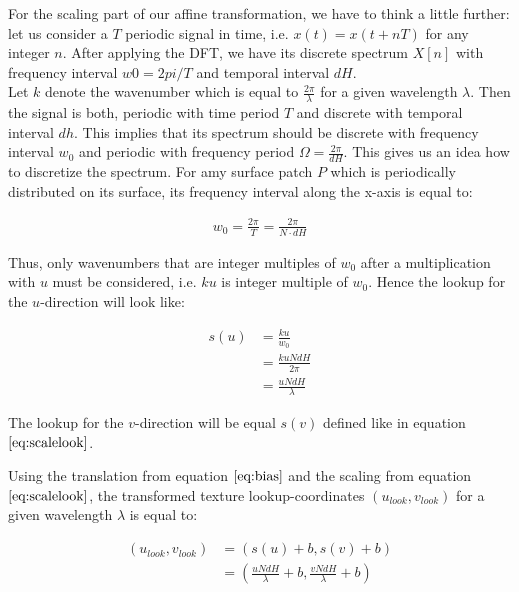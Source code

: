 For the scaling part of our affine transformation, we have to think a little further: let us consider a $T$ periodic signal in time, i.e. $x(t) = x(t+nT)$ for any integer $n$. After applying the DFT, we have its discrete spectrum $X[n]$ with frequency interval $w0 = 2pi / T$ and temporal interval $dH$. \\

Let $k$ denote the wavenumber which is equal to $\frac{2 \pi}{\lambda}$ for a given wavelength $\lambda$. Then the signal is both, periodic with time period $T$ and discrete with temporal interval $dh$. This implies that its spectrum should be discrete with frequency interval $w_0$ and periodic with frequency period $\Omega = \frac{2 \pi}{dH}$. This gives us an idea how to discretize the spectrum. For amy surface patch $P$ which is periodically distributed on its surface, its frequency interval along the x-axis is equal to: 

\begin{align}
  w_0 = \frac{2 \pi}{T} = \frac{2 \pi}{N \cdot dH}
\end{align}

Thus, only wavenumbers that are integer multiples of $w_0$ after a multiplication with $u$ must be considered, i.e. $ku$ is integer multiple of $w_0$. Hence the lookup for the $u$-direction will look like:

\begin{align}
    s(u)
    &=\frac{ku}{w_0} \nonumber \\
    &= \frac{ku N dH}{2 \pi} \nonumber \\
    &= \frac{u N dH}{\lambda}
\label{eq:scalelook}
\end{align}

The lookup for the $v$-direction will be equal $s(v)$ defined like in equation $\ref{eq:scalelook}$.

Using the translation from equation $\ref{eq:bias}$ and the scaling from equation $\ref{eq:scalelook}$, the transformed texture lookup-coordinates $(u_{look}, v_{look})$ for a given wavelength $\lambda$ is equal to:

\begin{align}
  (u_{look}, v_{look}) 
  &= \left(s(u)+b,s(v)+b \right) \nonumber \\
  &= \left( \frac{u N dH}{\lambda} + b, \frac{v N dH}{\lambda} + b \right)
\label{eq:ublookup}
\end{align}  

